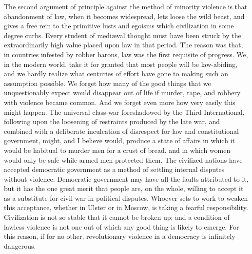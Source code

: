 The second argument of principle against the method of minority violence is that abandonment of law, when it becomes widespread, lets loose the wild beast, and gives a free rein to the primitive lusts and egoisms which civilization in some degree curbs. Every student of mediæval thought must have been struck by the extraordinarily high value placed upon law in that period. The reason was that, in countries infested by robber barons, law was the first requisite of progress. We, in the modern world, take it for granted that most people will be law-abiding, and we hardly realize what centuries of effort have gone to making such an assumption possible. We forget how many of the good things that we unquestionably expect would disappear out of life if murder, rape, and robbery with violence became common. And we forget even more how very easily this might happen. The universal class-war foreshadowed by the Third International, following upon the loosening of restraints produced by the late war, and combined with a deliberate inculcation of disrespect for law and constitutional government, might, and I believe would, produce a state of affairs in which it would be habitual to murder men for a crust of bread, and in which women would only be safe while armed men protected them. The civilized nations have accepted democratic government as a method of settling internal disputes without violence. Democratic government may have all the faults attributed to it, but it has the one great merit that people are, on the whole, willing to accept it as a substitute for civil war in political disputes. Whoever sets to work to weaken this acceptance, whether in Ulster or in Moscow, is taking a fearful responsibility. Civilization is not so stable that it cannot be broken up; and a condition of lawless violence is not one out of which any good thing is likely to emerge. For this reason, if for no other, revolutionary violence in a democracy is infinitely dangerous.